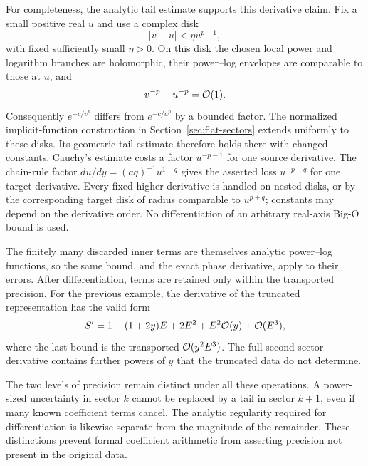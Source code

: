 For completeness, the analytic tail estimate supports this derivative
claim. Fix a small positive real $u$ and use a complex disk
\[
 |v-u|<\eta u^{p+1},
\]
with fixed sufficiently small $\eta>0$. On this disk the chosen local
power and logarithm branches are holomorphic, their power--log envelopes
are comparable to those at $u$, and
\[
 v^{-p}-u^{-p}=\mathcal O(1).
\]
Consequently $e^{-c/v^p}$ differs from $e^{-c/u^p}$ by a bounded factor.
The normalized implicit-function construction in
Section~\ref{sec:flat-sectors} extends uniformly to these disks. Its
geometric tail estimate therefore holds there with changed constants.
Cauchy's estimate costs a factor $u^{-p-1}$ for one source derivative.
The chain-rule factor $du/dy=(a q)^{-1}u^{1-q}$ gives the asserted loss
$u^{-p-q}$ for one target derivative. Every fixed higher derivative is
handled on nested disks, or by the corresponding target disk of radius
comparable to $u^{p+q}$; constants may depend on the derivative order.
No differentiation of an arbitrary real-axis Big-O bound is used.

The finitely many discarded inner terms are themselves analytic
power--log functions, so the same bound, and the exact phase derivative,
apply to their errors. After differentiation, terms are retained only within the transported precision. For the previous example, the derivative
of the truncated representation has the valid form
\[
 S'=1-(1+2y)E+2E^2+E^2\mathcal O(y)+\mathcal O(E^3),
\]
where the last bound is the transported $\mathcal O(y^2E^3)$.
The full second-sector derivative contains further powers of $y$ that the
truncated data do not determine.

The two levels of precision remain distinct under all these operations.
A power-sized uncertainty in sector $k$ cannot be replaced by a tail in
sector $k+1$, even if many known coefficient terms cancel. The analytic
regularity required for differentiation is likewise separate from the
magnitude of the remainder. These distinctions prevent formal coefficient
arithmetic from asserting precision not present in the original data.
